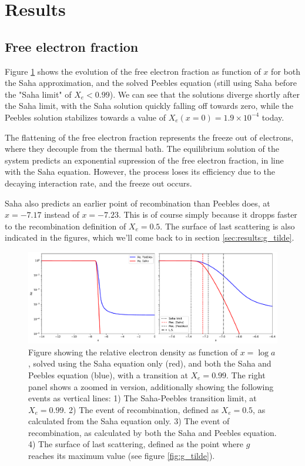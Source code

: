 \documentclass[10pt, a4paper]{article}
\begin{document}
\section{Results}
\subsection{Free electron fraction}
Figure \ref{fig:Xe} shows the evolution of the free electron fraction as function of $x$ for both the Saha approximation, and the solved Peebles equation (still using Saha before the "Saha limit" of $X_e < 0.99$). We can see that the solutions diverge shortly after the Saha limit, with the Saha solution quickly falling off towards zero, while the Peebles solution stabilizes towards a value of $X_e(x=0) = 1.9\times 10^{-4}$ today.

The flattening of the free electron fraction represents the freeze out of electrons, where they decouple from the thermal bath. The equilibrium solution of the system predicts an exponential supression of the free electron fraction, in line with the Saha equation. However, the process loses its efficiency due to the decaying interaction rate, and the freeze out occurs.

Saha also predicts an earlier point of recombination than Peebles does, at $x = -7.17$ instead of $x = - 7.23$. This is of course simply because it dropps faster to the recombination definition of $X_e = 0.5$. The surface of last scattering is also indicated in the figures, which we'll come back to in section \ref{sec:results:g_tilde}.



\begin{figure}[H]
    \centering
    \includegraphics[scale=0.5]{../m2_figs/Xe.pdf}
    \caption{Figure showing the relative electron density as function of $x=\log{a}$, solved using the Saha equation only (red), and both the Saha and Peebles equation (blue), with a transition at $X_e = 0.99$. The right panel shows a zoomed in version, additionally showing the following events as vertical lines: 1) The Saha-Peebles transition limit, at $X_e = 0.99$. 2) The event of recombination, defined as $X_e = 0.5$, as calculated from the Saha equation only. 3) The event of recombination, as calculated by both the Saha and Peebles equation. 4) The surface of last scattering, defined as the point where $g$ reaches its maximum value (see figure \ref{fig:g_tilde}).}
    \label{fig:Xe}
\end{figure}
\end{document}
